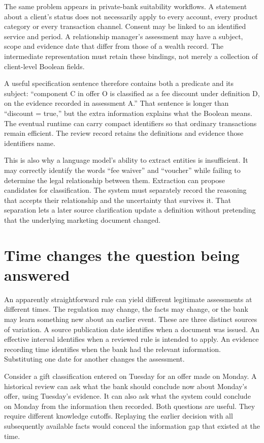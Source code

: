 \documentclass[12pt,a4paper,oneside,openany]{book}
\begin{document}
The same problem appears in private-bank suitability workflows. A statement
about a client's status does not necessarily apply to every account, every
product category or every transaction channel. Consent may be linked to an
identified service and period. A relationship manager's assessment may have a
subject, scope and evidence date that differ from those of a wealth record.
The intermediate representation must retain these bindings, not merely a
collection of client-level Boolean fields.

A useful specification sentence therefore contains both a predicate and its
subject: ``component C in offer O is classified as a fee discount under
definition D, on the evidence recorded in assessment A.'' That sentence is longer
than ``discount = true,'' but the extra information explains what the Boolean
means. The eventual runtime can carry compact identifiers so that ordinary
transactions remain efficient. The review record retains the definitions and
evidence those identifiers name.

This is also why a language model's ability to extract entities is insufficient.
It may correctly identify the words ``fee waiver'' and ``voucher'' while failing
to determine the legal relationship between them. Extraction can propose
candidates for classification. The system must separately record the reasoning
that accepts their relationship and the uncertainty that survives it. That
separation lets a later source clarification update a definition without
pretending that the underlying marketing document changed.

\section{Time changes the question being answered}
\label{merge:M01:06}

\label{sec:problem-time}
An apparently straightforward rule can yield different legitimate assessments
at different times. The regulation may change, the facts may change, or the
bank may learn something new about an earlier event. These are three distinct
sources of variation. A source publication date identifies when a document was
issued. An effective interval identifies when a reviewed rule is intended to
apply. An evidence recording time identifies when the bank had the relevant
information. Substituting one date for another changes the assessment.

Consider a gift classification entered on Tuesday for an offer made on Monday.
A historical review can ask what the bank should conclude now about Monday's
offer, using Tuesday's evidence. It can also ask what the system could conclude
on Monday from the information then recorded. Both questions are useful. They
require different knowledge cutoffs. Replaying the earlier decision with all
subsequently available facts would conceal the information gap that existed at
the time.
\end{document}
